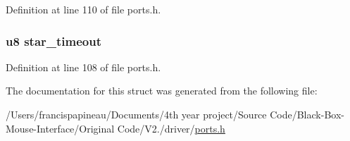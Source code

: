 \-Definition at line 110 of file ports.\-h.

\hypertarget{structstruct__button_a1b529be95d311858f31847dc3b73b7d1}{
\subsubsection[{star\-\_\-timeout}]{\setlength{\rightskip}{0pt plus 5cm}u8 {\bf star\-\_\-timeout}}}\label{structstruct__button_a1b529be95d311858f31847dc3b73b7d1}


\-Definition at line 108 of file ports.\-h.



\-The documentation for this struct was generated from the following file\-:\begin{DoxyCompactItemize}
\item 
/\-Users/francispapineau/\-Documents/4th year project/\-Source Code/\-Black-\/\-Box-\/\-Mouse-\/\-Interface/\-Original Code/\-V2./driver/\hyperlink{ports_8h}{ports.\-h}\end{DoxyCompactItemize}
